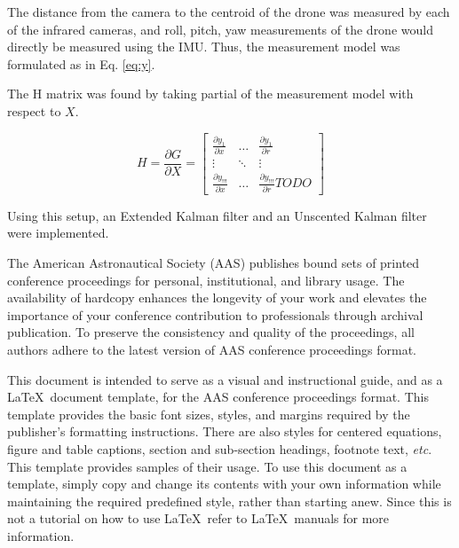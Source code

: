 \documentclass[letterpaper, preprint, paper,11pt]{AAS}	%
\begin{document}
The distance from the camera to the centroid of the drone was measured by each of the infrared cameras, and roll, pitch, yaw measurements of the drone would directly be measured using the IMU. Thus, the measurement model was formulated as in Eq. \ref{eq:y}.



The H matrix was found by taking partial of the measurement model with respect to $X$.

\begin{equation}
\label{eq:H}
H = \frac{\partial G}{\partial X} =
\begin{bmatrix}
	\frac{\partial y_1}{\partial x} & \dots  & \frac{\partial y_1}{\partial r}\\
    \vdots & \ddots & \vdots\\
    \frac{\partial y_{!!!}}{\partial x} & \dots  & \frac{\partial y_{!!!}}{\partial r}
TODO
\end{bmatrix}
\end{equation}

Using this setup, an Extended Kalman filter and an Unscented Kalman filter were implemented. 

The American Astronautical Society (AAS) publishes bound sets of printed conference proceedings for personal, institutional, and library usage. The availability of hardcopy enhances the longevity of your work and elevates the importance of your conference contribution to professionals through archival publication. To preserve the consistency and quality of the proceedings, all authors adhere to the latest version of AAS conference proceedings format.

This document is intended to serve as a visual and instructional guide, and as a \LaTeX\ document template, for the AAS conference proceedings format. This template provides the basic font sizes, styles, and margins required by the publisher's formatting instructions.   There are also styles for centered equations, figure and table captions, section and sub-section headings, footnote text, \emph{etc}. This template provides samples of their usage.  To use this document as a template, simply copy and change its contents with your own information while maintaining the required predefined style, rather than starting anew. Since this is not a tutorial on how to use \LaTeX\, refer to \LaTeX\ manuals for more information.
\end{document}
